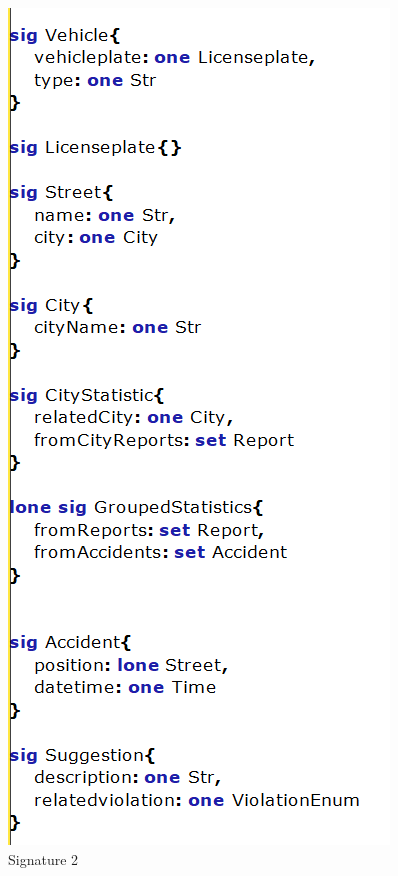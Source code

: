 \begin{figure}
	\centering
	\includegraphics[width=0.7\linewidth, height=0.7\textheight]{Images/Alloy/codealloy2}
	\caption{Signature 2}
	\label{Signature 2}
\end{figure}


